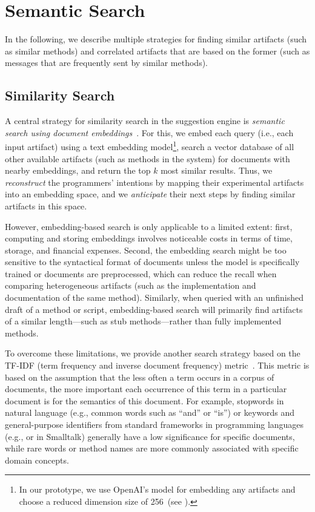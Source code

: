 
\section{Semantic Search}
\label{sec:suggestions/search}

In the following, we describe multiple strategies for finding similar artifacts (such as similar methods) and correlated artifacts that are based on the former (such as messages that are frequently sent by similar methods).

\subsection*{Similarity Search}
\label{sec:suggestions/search/similar}

A central strategy for similarity search in the suggestion engine is \emph{semantic search using document embeddings}~\cite{lewis2020retrieval,mikolov2013efficient}.
For this, we embed each query (i.e., each input artifact) using a text embedding model\footnote{In our prototype, we use OpenAI's  model for embedding any artifacts and choose a reduced dimension size of 256~(see ).}, search a vector database of all other available artifacts (such as methods in the system) for documents with nearby embeddings, and return the top $k$ most similar results.
Thus, we \emph{reconstruct} the programmers' intentions by mapping their experimental artifacts into an embedding space, and we \emph{anticipate} their next steps by finding similar artifacts in this space.

However, embedding-based search is only applicable to a limited extent:
first, computing and storing embeddings involves noticeable costs in terms of time, storage, and financial expenses.
Second, the embedding search might be too sensitive to the syntactical format of documents unless the model is specifically trained or documents are preprocessed, which can reduce the recall when comparing heterogeneous artifacts (such as the implementation and documentation of the same method).
Similarly, when queried with an unfinished draft of a method or script, embedding-based search will primarily find artifacts of a similar length---such as stub methods---rather than fully implemented methods.

To overcome these limitations, we provide another search strategy based on the TF-IDF (term frequency and inverse document frequency) metric~\cite{salton1988term}.
This metric is based on the assumption that the less often a term occurs in a corpus of documents, the more important each occurrence of this term in a particular document is for the semantics of this document.
For example, stopwords in natural language (e.g., common words such as ``and'' or ``is'') or keywords and general-purpose identifiers from standard frameworks in programming languages (e.g.,  or  in Smalltalk) generally have a low significance for specific documents, while rare words or method names are more commonly associated with specific domain concepts.

